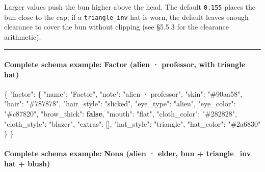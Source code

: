 \documentclass[
  11pt,
]{book}
\newenvironment{Shaded}{}{}
\newcommand{\DataTypeTok}[1]{\textcolor[rgb]{0.56,0.13,0.00}{#1}}
\newcommand{\FunctionTok}[1]{\textcolor[rgb]{0.02,0.16,0.49}{#1}}
\newcommand{\KeywordTok}[1]{\textcolor[rgb]{0.00,0.44,0.13}{\textbf{#1}}}
\newcommand{\OtherTok}[1]{\textcolor[rgb]{0.00,0.44,0.13}{#1}}
\newcommand{\StringTok}[1]{\textcolor[rgb]{0.25,0.44,0.63}{#1}}
\begin{document}
Larger values push the bun higher above the head. The default
\texttt{0.155} places the bun close to the cap; if a
\texttt{triangle\_inv} hat is worn, the default leaves enough clearance
to cover the bun without clipping (see §5.5.3 for the clearance
arithmetic).

\begin{center}\rule{0.5\linewidth}{0.5pt}\end{center}

\paragraph{Complete schema example: Factor (alien · professor, with
triangle
hat)}\label{complete-schema-example-factor-alien-professor-with-triangle-hat}

\begin{Shaded}
\begin{Highlighting}[]
\FunctionTok{\{}
  \DataTypeTok{"factor"}\FunctionTok{:} \FunctionTok{\{}
    \DataTypeTok{"name"}\FunctionTok{:}        \StringTok{"Factor"}\FunctionTok{,}
    \DataTypeTok{"note"}\FunctionTok{:}        \StringTok{"alien · professor"}\FunctionTok{,}
    \DataTypeTok{"skin"}\FunctionTok{:}        \StringTok{"\#90aa58"}\FunctionTok{,}
    \DataTypeTok{"hair"}\FunctionTok{:}        \StringTok{"\#787878"}\FunctionTok{,}
    \DataTypeTok{"hair\_style"}\FunctionTok{:}  \StringTok{"slicked"}\FunctionTok{,}
    \DataTypeTok{"eye\_type"}\FunctionTok{:}    \StringTok{"alien"}\FunctionTok{,}
    \DataTypeTok{"eye\_color"}\FunctionTok{:}   \StringTok{"\#c87820"}\FunctionTok{,}
    \DataTypeTok{"brow\_thick"}\FunctionTok{:}  \KeywordTok{false}\FunctionTok{,}
    \DataTypeTok{"mouth"}\FunctionTok{:}       \StringTok{"flat"}\FunctionTok{,}
    \DataTypeTok{"cloth\_color"}\FunctionTok{:} \StringTok{"\#282828"}\FunctionTok{,}
    \DataTypeTok{"cloth\_style"}\FunctionTok{:} \StringTok{"blazer"}\FunctionTok{,}
    \DataTypeTok{"extras"}\FunctionTok{:}      \OtherTok{[]}\FunctionTok{,}
    \DataTypeTok{"hat\_style"}\FunctionTok{:}   \StringTok{"triangle"}\FunctionTok{,}
    \DataTypeTok{"hat\_color"}\FunctionTok{:}   \StringTok{"\#2a6830"}
  \FunctionTok{\}}
\FunctionTok{\}}
\end{Highlighting}
\end{Shaded}

\paragraph{Complete schema example: Nona (alien · elder, bun +
triangle\_inv hat +
blush)}\label{complete-schema-example-nona-alien-elder-bun-triangle_inv-hat-blush}
\end{document}
